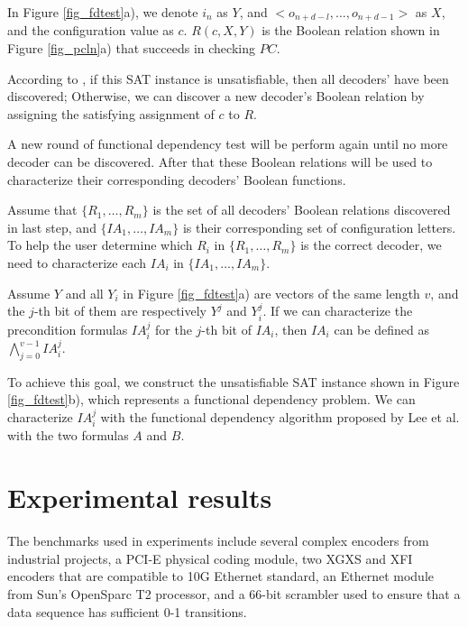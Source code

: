 \documentclass[runningheads,a4paper]{llncs}
\begin{document}
In Figure \ref{fig_fdtest}a),
we denote $i_n$ as $Y$,
and $<o_{n+d-l},\dots,o_{n+d-1}>$ as $X$,
and the configuration value as $c$.
$R(c,X,Y)$ is the Boolean relation shown in Figure \ref{fig_pcln}a) that succeeds in checking $PC$.

According to \cite{ShengYuShen:tcad12},
if this SAT instance is unsatisfiable,
then all decoders' have been discovered;
Otherwise,
we can discover a new decoder's Boolean relation by assigning the satisfying assignment of $c$ to $R$.

A new round of functional dependency test will be perform again until no more decoder can be discovered.
After that these Boolean relations will be used to characterize their corresponding decoders' Boolean functions.

\vspace{0.2cm}
\vspace{0.2cm}

Assume that $\{R_1,\dots,R_{m}\}$ is the set of all decoders' Boolean relations discovered in last step,
and $\{IA_1,\dots,IA_{m}\}$ is their corresponding set of configuration letters.
To help the user determine which $R_i$ in $\{R_1,\dots,R_{m}\}$ is the correct decoder,
we need to characterize each $IA_i$ in $\{IA_1,\dots,IA_{m}\}$.

Assume $Y$ and all $Y_i$ in Figure \ref{fig_fdtest}a) are vectors of the same length $v$,
and the $j$-th bit of them are respectively $Y^{j}$ and $Y_i^{j}$.
If we can characterize the precondition formulas $IA^j_i$ for the $j$-th bit of $IA_i$,
then $IA_i$ can be defined as $\bigwedge _{j=0}^{v-1} IA^j_i$. 

To achieve this goal, 
we construct the unsatisfiable SAT instance shown in Figure \ref{fig_fdtest}b),
which represents a functional dependency problem.
We can characterize $IA^j_i$ with the functional dependency algorithm proposed by Lee et al. \cite{funcdep} with the two formulas $A$ and $B$.



\section{Experimental results}\label{sec_exp}
The benchmarks used in experiments include several complex encoders from industrial projects,
a PCI-E\cite{PCIESPEC} physical coding module,
two XGXS and XFI encoders that are compatible to 10G Ethernet\cite{IEEE80232002} standard,
an Ethernet module from Sun's OpenSparc T2 processor,
and a 66-bit scrambler used to ensure that a data sequence has sufficient 0-1 transitions.
\end{document}
